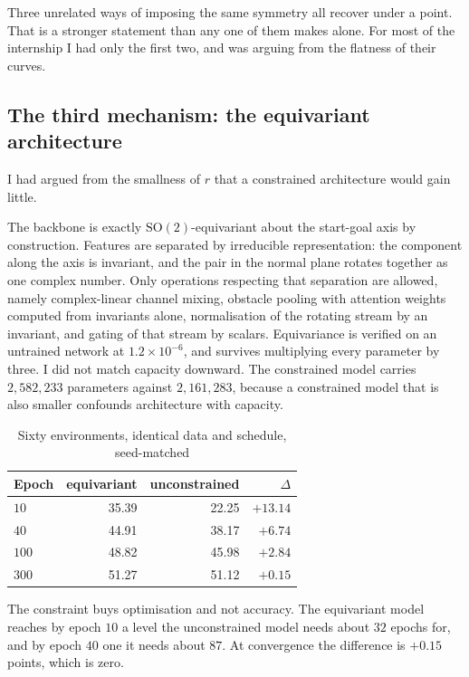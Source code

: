 \documentclass[11pt,a4paper]{article}
\newcommand{\toprule}{\hline}
\newcommand{\midrule}{\hline}
\newcommand{\bottomrule}{\hline}
\newcommand{\SO}{\mathrm{SO}}
\begin{document}
Three unrelated ways of imposing the same symmetry all recover under a point.
That is a stronger statement than any one of them makes alone. For most of the
internship I had only the first two, and was arguing from the flatness of their
curves.

\subsection{The third mechanism: the equivariant architecture}
\label{sec:arch}

I had argued from the smallness of $r$ that a constrained architecture would gain
little. 

The backbone is exactly $\SO(2)$-equivariant about the start-goal axis by
construction. Features are separated by irreducible representation: the component
along the axis is invariant, and the pair in the normal plane rotates together as
one complex number. Only operations respecting that separation are allowed,
namely complex-linear channel mixing, obstacle pooling with attention weights
computed from invariants alone, normalisation of the rotating stream by an
invariant, and gating of that stream by scalars. Equivariance is verified on an
untrained network at $1.2 \times 10^{-6}$, and survives multiplying every
parameter by three. I did not match capacity downward. The constrained model
carries $2{,}582{,}233$ parameters against $2{,}161{,}283$, 
because a constrained model that is also smaller confounds architecture with
capacity.

\begin{table}[t]
\centering\small
\begin{tabular}{lrrr}
\toprule
Epoch & equivariant & unconstrained & $\Delta$ \\
\midrule
$10$  & 35.39 & 22.25 & $+13.14$ \\
$40$  & 44.91 & 38.17 & $+6.74$ \\
$100$ & 48.82 & 45.98 & $+2.84$ \\
$300$ & 51.27 & 51.12 & $+0.15$ \\
\bottomrule
\end{tabular}
\caption{Sixty environments, identical data and schedule, seed-matched}
\label{tab:arch}
\end{table}

The constraint buys optimisation and not accuracy. The equivariant model reaches
by epoch $10$ a level the unconstrained model needs about $32$ epochs for, and by
epoch $40$ one it needs about $87$. At convergence the difference is $+0.15$
points, which is zero.
\end{document}
